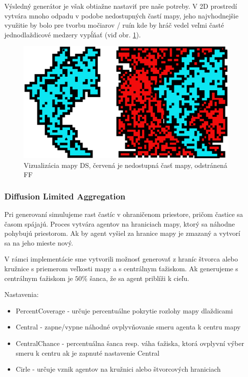 Výsledný generátor je však obtiažne nastaviť pre naše potreby. V 2D prostredí vytvára mnoho odpadu v podobe nedostupných častí mapy, jeho najvhodnejšie využitie by bolo pre tvorbu močiarov / ruín kde by hráč vedel veľmi časté jednodlaždicové medzery vypĺňať (viď obr. \ref{fig:ds}).   

\begin{figure} [H]
    \centering
    \includegraphics[width=0.5\linewidth]{obrazky-figures/ds.png}
    \caption{Vizualizácia mapy DS, červená je nedostupná časť mapy, odstránená FF}
    \label{fig:ds}
\end{figure}

\subsubsection*{Diffusion Limited Aggregation}

Pri generovaní simulujeme rast častíc v ohraničenom priestore, pričom častice sa časom spájajú. Proces vytvára agentov na hraniciach mapy, ktorý sa náhodne pohybujú priestorom. Ak by agent vyšiel za hranice mapy je zmazaný a vytvorí sa na jeho mieste nový. 

V rámci implementácie sme vytvorili možnosť generovať z hraníc štvorca alebo kružnice s priemerom veľkosti mapy a s centrálnym ťažiskom. Ak generujeme s centrálnym ťažiskom je $50\%$ šanca, že sa agent priblíži k cieľu.

\noindent Nastavenia:

\begin{itemize}
    \item PercentCoverage - určuje percentuálne pokrytie rozlohy mapy dlaždicami
    \item Central - zapne/vypne náhodné ovplyvňovanie smeru agenta k centru mapy
    \item CentralChance - percentuálna šanca resp. váha ťažiska, ktorá ovplyvní výber smeru k centru ak je zapnuté nastavenie Central
    \item Cirle - určuje vznik agentov na kružnici alebo štvorcových hraniciach
\end{itemize}

